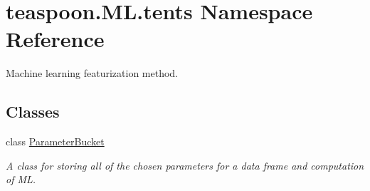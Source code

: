 \hypertarget{namespaceteaspoon_1_1_m_l_1_1tents}{}\section{teaspoon.\+M\+L.\+tents Namespace Reference}
\label{namespaceteaspoon_1_1_m_l_1_1tents}


Machine learning featurization method.


\subsection*{Classes}
\begin{DoxyCompactItemize}
\item
class \hyperlink{classteaspoon_1_1_m_l_1_1tents_1_1_parameter_bucket}{Parameter\+Bucket}
\begin{DoxyCompactList}\small\item\em A class for storing all of the chosen parameters for a data frame and computation of ML. \end{DoxyCompactList}\end{DoxyCompactItemize}
